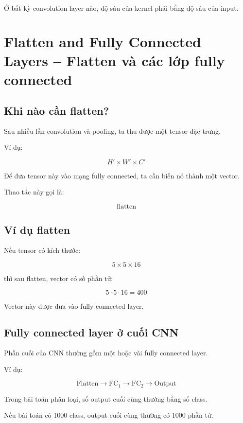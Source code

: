 \begin{ghinho}
Ở bất kỳ convolution layer nào, độ sâu của kernel phải bằng độ sâu của input.
\end{ghinho}

\section{Flatten and Fully Connected Layers -- Flatten và các lớp fully connected}

\subsection{Khi nào cần flatten?}

Sau nhiều lần convolution và pooling, ta thu được một tensor đặc trưng.

Ví dụ:

\[
    H' \times W' \times C'
\]

Để đưa tensor này vào mạng fully connected, ta cần biến nó thành một vector.

Thao tác này gọi là:

\[
    \text{flatten}
\]

\subsection{Ví dụ flatten}

Nếu tensor có kích thước:

\[
    5 \times 5 \times 16
\]

thì sau flatten, vector có số phần tử:

\[
    5\cdot5\cdot16=400
\]

Vector này được đưa vào fully connected layer.

\subsection{Fully connected layer ở cuối CNN}

Phần cuối của CNN thường gồm một hoặc vài fully connected layer.

Ví dụ:

\[
    \text{Flatten}
    \rightarrow
    \text{FC}_1
    \rightarrow
    \text{FC}_2
    \rightarrow
    \text{Output}
\]

Trong bài toán phân loại, số output cuối cùng thường bằng số class.

\begin{vidu}
Nếu bài toán có 1000 class, output cuối cùng thường có 1000 phần tử.
\end{vidu}

